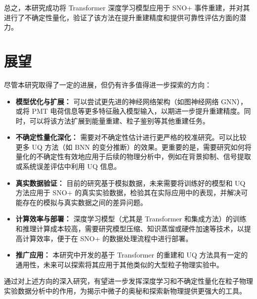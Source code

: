 总之，本研究成功将 Transformer 深度学习模型应用于 SNO+ 事件重建，并对其进行了不确定性量化，验证了该方法在提升重建精度和提供可靠性评估方面的潜力。

\section{展望}

尽管本研究取得了一定的进展，但仍有许多值得进一步探索的方向：
\begin{itemize}
    \item \textbf{模型优化与扩展：} 可以尝试更先进的神经网络架构（如图神经网络 GNN），或将 PMT 电荷信息等更多特征融入模型输入，以期进一步提升重建精度。同时，可以将该方法扩展到能量重建、粒子鉴别等其他重建任务。
    \item \textbf{不确定性量化深化：} 需要对不确定性估计进行更严格的校准研究。可以比较更多 UQ 方法（如 BNN 的变分推断）的效果。更重要的是，需要研究如何将量化的不确定性有效地应用于后续的物理分析中，例如在背景抑制、信号提取或系统误差评估中利用 UQ 信息。
    \item \textbf{真实数据验证：} 目前的研究基于模拟数据，未来需要将训练好的模型和 UQ 方法应用于 SNO+ 的真实实验数据，检验其在实际应用中的表现，并解决可能存在的模拟与真实数据之间的差异问题。
    \item \textbf{计算效率与部署：} 深度学习模型（尤其是 Transformer 和集成方法）的训练和推理计算成本较高，需要研究模型压缩、知识蒸馏或硬件加速等技术，以提高计算效率，便于在 SNO+ 的数据处理流程中进行部署。
    \item \textbf{推广应用：} 本研究中开发的基于 Transformer 的重建和 UQ 方法具有一定的通用性，未来可以探索将其应用于其他类似的大型粒子物理实验中。
\end{itemize}

通过对上述方向的深入研究，有望进一步发挥深度学习和不确定性量化在粒子物理实验数据分析中的作用，为揭示中微子的奥秘和探索新物理提供更强大的工具。





